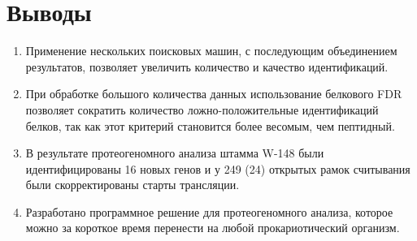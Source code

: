 \newpage

\section{Выводы}

\begin{enumerate} 
\item Применение нескольких поисковых машин, с последующим объединением результатов, позволяет увеличить количество и качество идентификаций.

\item При обработке большого количества данных использование белкового FDR позволяет сократить количество ложно-положительные идентификаций белков, так как этот критерий становится более весомым, чем пептидный.

\item В результате протеогеномного анализа штамма  W-148 были идентифицированы 16 новых генов и у 249 (24) открытых рамок считывания были скорректированы старты трансляции.

\item Разработано программное решение для протеогеномного анализа, которое можно за короткое время перенести на любой прокариотический организм.
\end{enumerate}
\newpage
